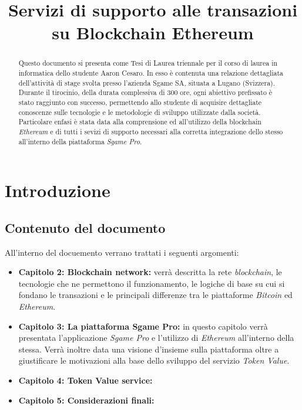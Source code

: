 \documentclass[11pt]{thesistemp}
\title{Servizi di supporto alle transazioni su Blockchain Ethereum}
\begin{document}
\maketitle
\pagebreak
\begin{abstract}
Questo documento si presenta come Tesi di Laurea triennale per il corso di laurea in informatica dello studente Aaron Cesaro. In esso \`e contenuta una relazione dettagliata dell’attivit\`a di stage svolta presso l’azienda Sgame SA, situata a Lugano (Svizzera). Durante il tirocinio, della durata complessiva di 300 ore, ogni abiettivo prefissato \`e stato raggiunto con successo, permettendo allo studente di acquisire dettagliate conoscenze sulle tecnologie e le metodologie di sviluppo utilizzate dalla società.
Particolare enfasi è stata data alla comprensione ed all'utilizzo della blockchain \textit{Ethereum} e di tutti i sevizi di supporto necessari alla corretta integrazione dello stesso all'interno della piattaforma \textit{Sgame Pro}.
\end{abstract}

\tableofcontents


\section{Introduzione}

\subsection{Contenuto del documento}

All'interno del docuemento verrano trattati i seguenti argomenti: 
\begin{itemize}
	\item \textbf{Capitolo 2: Blockchain network:} verrà descritta la rete \textit{blockchain}, le tecnologie che ne permettono il funzionamento, le logiche di base su cui si fondano le transazioni e le principali differenze tra le piattaforme \textit{Bitcoin} ed \textit{Ethereum}.
	\item \textbf{Capitolo 3: La piattaforma Sgame Pro:} in questo capitolo verrà presentata l'applicazione \textit{Sgame Pro} e l'utilizzo di \textit{Ethereum} all'interno della stessa. Verrà inoltre data una visione d'insieme sulla piattaforma oltre a giustificare le motivazioni alla base dello sviluppo del servizio \textit{Token Value}.
	\item \textbf{Capitolo 4: Token Value service:}
	\item \textbf{Capitolo 5: Considerazioni finali:}
\end{itemize}
\end{document}
